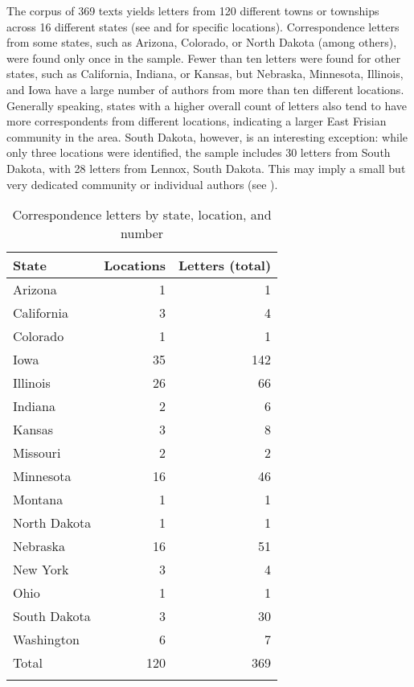 \documentclass[output=paper]{langsci/langscibook}
\begin{document}
The corpus of 369 texts yields letters from 120 different towns or townships across 16 different states (see  and  for specific locations). Correspondence letters from some states, such as Arizona, Colorado, or North Dakota (among others), were found only once in the sample. Fewer than ten letters were found for other states, such as California, Indiana, or Kansas, but Nebraska, Minnesota, Illinois, and Iowa have a large number of authors from more than ten different locations. Generally speaking, states with a higher overall count of letters also tend to have more correspondents from different locations, indicating a larger East Frisian community in the area. South Dakota, however, is an interesting exception: while only three locations were identified, the sample includes 30 letters from South Dakota, with 28 letters from Lennox, South Dakota. This may imply a small but very dedicated community or individual authors (see ).
 
 
\begin{table}
\begin{tabular}{lrr}
\lsptoprule
{State} & Locations & Letters (total)\\
\midrule
Arizona & 1 & 1\\
California & 3 & 4\\
Colorado & 1 & 1\\
Iowa & 35 & 142\\
Illinois & 26 & 66\\
Indiana & 2 & 6\\
Kansas & 3 & 8\\
Missouri & 2 & 2\\
Minnesota & 16 & 46\\
Montana & 1 & 1\\
North Dakota & 1 & 1\\
Nebraska & 16 & 51\\
New York & 3 & 4\\
Ohio & 1 & 1\\
South Dakota & 3 & 30\\
Washington & 6 & 7\\
\midrule
Total & 120 & 369\\
\lspbottomrule
\end{tabular}
\caption{Correspondence letters by state, location, and number\label{tab:rocker:2}}
\end{table}
\end{document}
